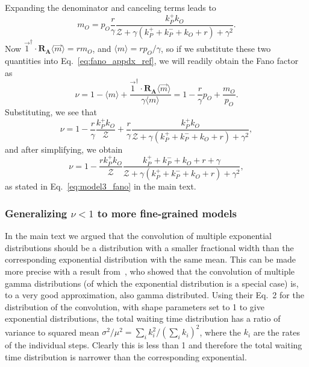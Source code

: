 Expanding the denominator and canceling terms leads to
\begin{equation}
m_O = p_O \frac{r}{\gamma} \frac{k_P^+ k_O}
    {\mathcal{Z} + \gamma(k_P^+ + k_P^- + k_O + r) + \gamma^2}.
\end{equation}
Now $\vec{1}^\dagger\cdot\mathbf{R_A}\langle\vec{m}\rangle = r m_O$, and
$\langle{m}\rangle = rp_O/\gamma$, so if we substitute these two quantities into
Eq.~\ref{eq:fano_appdx_ref}, we will readily obtain the Fano factor as
\begin{equation}
\nu = 1 - \langle{m}\rangle
    + \frac{\vec{1}^\dagger\cdot\mathbf{R_A}\langle\vec{m}\rangle}
            {\gamma \langle{m}\rangle}
= 1 - \frac{r}{\gamma}p_O + \frac{m_O}{p_O}.
\end{equation}
Substituting, we see that
\begin{equation}
\nu = 1 - \frac{r}{\gamma} \frac{k_P^+ k_O}{\mathcal{Z}}
    + \frac{r}{\gamma}
    \frac{k_P^+ k_O}
            {\mathcal{Z} + \gamma(k_P^+ + k_P^- + k_O + r) + \gamma^2},
\end{equation}
and after simplifying, we obtain
\begin{equation}
\nu = 1 - \frac{r k_P^+ k_O}{\mathcal{Z}}
        \frac{k_P^+ + k_P^- + k_O + r + \gamma}
            {\mathcal{Z} + \gamma(k_P^+ + k_P^- + k_O + r) + \gamma^2},
\end{equation}
as stated in Eq.~\ref{eq:model3_fano} in the main text.

\subsubsection{Generalizing $\nu<1$ to more fine-grained models}
In the main text we argued that the convolution of multiple
exponential distributions should be a distribution with a smaller
fractional width than the corresponding exponential distribution
with the same mean.
This can be made more precise with a result from~\cite{Stewart2007},
who showed that the convolution of multiple gamma distributions (of which the
exponential distribution is a special case) is, to a very good approximation,
also gamma distributed. Using their Eq.~2 for the distribution of the
convolution, with shape parameters set to 1 to give exponential distributions,
the total waiting time distribution has a ratio of variance to squared mean
$\sigma^2/\mu^2 = \sum_i k_i^2/\left(\sum_i k_i\right)^2$, where the $k_i$ are
the rates of the individual steps. Clearly this is less than 1 and therefore the
total waiting time distribution is narrower than the corresponding exponential.

